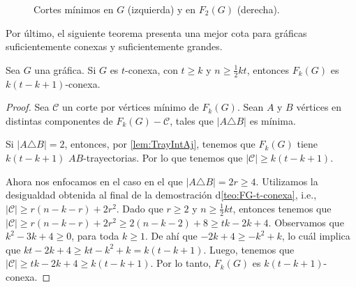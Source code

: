 \begin{figure}[ht!]
    \caption{Cortes m\'inimos en $G$ (izquierda) y en $F_2(G)$ (derecha).}
    \label{fig:ex-tConect}
    \end{figure}

Por \'ultimo, el siguiente teorema presenta una mejor cota para gr\'aficas
suficientemente conexas y suficientemente grandes.

\begin{teorema}%
    \label{teo:FG_k(t- k+ 1)-conexa}
        Sea $G$ una gr\'afica. Si $G$ es $t$-conexa, con $t \ge k$ y $n \ge
        \frac{1}{2} kt$, entonces $F_{k}(G)$ es $k (t- k+ 1)$-conexa.
    \end{teorema}

    \begin{proof}
        Sea $\mathcal{C}$ un corte por v\'ertices m\'inimo de $F_k(G)$. Sean $A$
        y $B$ v\'ertices en distintas componentes de $F_k(G)- \mathcal{C}$,
        tales que $|A \triangle B|$ es m\'inima.

        Si $|A \triangle B| = 2$, entonces, por \cref{lem:TrayIntAj}, tenemos
        que $F_k(G)$ tiene $k (t- k+ 1)$ $AB$-trayectorias. Por lo que tenemos
        que $|\mathcal{C}| \geq k (t- k+ 1)$.

        Ahora nos enfocamos en el caso en el que $|A \triangle B| = 2r \ge 4$.
        Utilizamos la desigualdad obtenida al final de la demostraci\'on
        d\cref{teo:FG-t-conexa}, i.e., $|\mathcal{C}| \ge r(n-k-r)+2r^2$. Dado
        que $r \ge 2$ y $n \ge \frac{1}{2}kt$, entonces tenemos que
        $|\mathcal{C}| \ge r(n-k-r)+2r^2 \ge 2 (n- k -2) + 8 \ge tk - 2k+ 4$.
        Observamos que $k^2 -3k + 4 \ge 0$, para toda $k \ge 1$. De ah\'i que
        $-2k+4 \ge -k^2 + k$, lo cu\'al implica que $kt -2k +4 \ge kt - k^2 + k
        = k (t - k +1)$. Luego, tenemos que $|\mathcal{C}| \ge tk -2k +4 \ge
        k(t-k+1)$. Por lo tanto, $F_k(G)$ es $k(t-k+1)$-conexa.
    \end{proof}